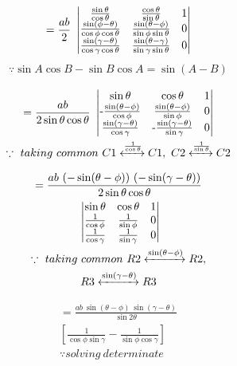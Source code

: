 \documentclass[journal,12pt,twocolumn]{IEEEtran}
\begin{document}
\begin{multline}
=\frac{ab}{2}~\begin{vmatrix}
 \frac{\sin\theta}{\cos\theta} & \frac{\cos\theta}{\sin\theta} & 1  \\ 
 \frac{\sin(\phi-\theta)}{\cos\phi\cos\theta} & \frac{\sin(\theta-\phi)}{\sin\phi\sin\theta} & 0  \\
 \frac{\sin(\gamma-\theta)}{\cos\gamma\cos\theta} & \frac{\sin(\theta-\gamma)}{\sin\gamma\sin\theta} & 0 
\end{vmatrix}    
\end{multline}
\begin{align*}
\because \sin A\cos B - \sin B\cos A = \sin(A-B)
\end{align*}

\begin{multline}
=\frac{ab}{2 \sin\theta\cos\theta}~\mydet{
 {\sin\theta} & {\cos\theta} & 1  \\ $-$
 \frac{\sin(\theta-\phi)}{\cos\phi} & \frac{\sin(\theta-\phi)}{\sin\phi} & 0  \\
 \frac{\sin(\gamma-\theta)}{\cos\gamma} &$-$ \frac{\sin(\gamma-\theta)}{\sin\gamma} & 0 
}\\
\because~taking~ common ~ C1 \xleftrightarrow{{\frac{1}{\cos\theta}}} C1,~C2 \xleftrightarrow{{\frac{1}{\sin\theta}}} C2
\end{multline}


\begin{multline}
=\frac{ab~(-\sin(\theta-\phi))~(-\sin(\gamma-\theta))}{2 \sin\theta\cos\theta}\\~\begin{vmatrix}
 {\sin\theta} & {\cos\theta} & 1  \\ 
 \frac{1}{\cos\phi} & \frac{1}{\sin\phi} & 0  \\
 \frac{1}{\cos\gamma} & \frac{1}{\sin\gamma} & 0 
\end{vmatrix}    \\\because~taking~ common ~ R2 \xleftrightarrow{{\sin(\theta-\phi)}} R2,\\R3 \xleftrightarrow{{\sin(\gamma-\theta)}} R3
\end{multline}




\begin{multline}
=\frac{ab~\sin(\theta-\phi)~\sin(\gamma-\theta)}{ \sin2\theta}\\\left[\frac{1}{\cos\phi\sin\gamma}-\frac{1}{\sin\phi\cos\gamma}
\right]\\
\because solving~determinate 
\end{multline}
\end{document}

